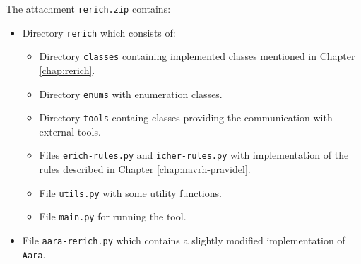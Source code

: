 The attachment \texttt{rerich.zip} contains:

\begin{itemize}
	\item Directory \texttt{rerich} which consists of:
	\begin{itemize}
		\item Directory \texttt{classes} containing implemented classes mentioned in Chapter \ref{chap:rerich}.
		\item Directory \texttt{enums} with enumeration classes.
		\item Directory \texttt{tools} containg classes providing the communication with external tools.
		\item Files \texttt{erich-rules.py} and \texttt{icher-rules.py} with implementation of the rules described in Chapter \ref{chap:navrh-pravidel}.
		\item File \texttt{utils.py} with some utility functions.
		\item File \texttt{main.py} for running the tool.
	\end{itemize}
	\item File \texttt{aara-rerich.py} which contains a slightly modified implementation of \texttt{Aara}.
\end{itemize}
